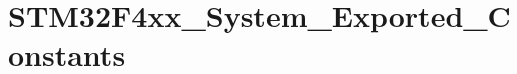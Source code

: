\hypertarget{group___s_t_m32_f4xx___system___exported___constants}{\section{S\-T\-M32\-F4xx\-\_\-\-System\-\_\-\-Exported\-\_\-\-Constants}
\label{group___s_t_m32_f4xx___system___exported___constants}
}
